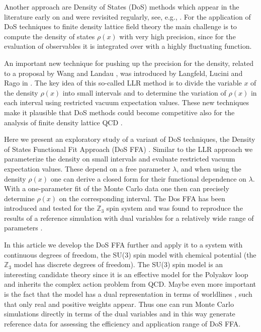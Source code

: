 \documentclass[a4paper,11pt]{article}
\begin{document}
Another approach are Density of States (DoS) methods which appear in the literature early on  
\cite{Gocksch:1987nt,Gocksch:1988iz} and were revisited regularly, see, e.g., 
\cite{Schmidt:2005ap,Fodor:2007vv,Ejiri:2007ga,Ejiri:2012ng}. For the application of DoS techniques 
to finite density lattice field theory the main challenge is to compute the density of states $\rho(x)$ with very high 
precision, since for the evaluation of observables it is integrated over with a highly fluctuating function. 

An important new technique for pushing up the precision for the density, related to a proposal by 
Wang and Landau \cite{PhysRevLett.86.2050}, was introduced by Langfeld, Lucini and Rago in 
\cite{Langfeld:2012ah,Langfeld:2013xbf,Langfeld:2014nta,Langfeld:2015fua,Garron:2016noc}. The key idea of this 
so-called LLR method is to divide the variable 
$x$ of the density $\rho(x)$ into small intervals and to determine the variation of $\rho(x)$ in each interval using restricted 
vacuum expectation values. These new techniques make it plausible that DoS methods could become competitive
also for the analysis of finite density lattice QCD \cite{Gattringer:2016kco}. 

Here we present an exploratory study of a variant of DoS techniques, the Density of States Functional Fit Approach
(DoS FFA) \cite{Mercado:2014dva,Gattringer:2015lra,Gattringer:2015eey}. 
Similar to the LLR approach we parameterize the density on small intervals and evaluate restricted vacuum 
expectation values. These depend on a free parameter $\lambda$, and when using the density $\rho(x)$ one
can derive a closed form for their functional dependence on $\lambda$. With a one-parameter fit of the Monte Carlo data
one then can precisely determine $\rho(x)$ on the corresponding interval. The Dos FFA has been introduced and tested 
for the $\mathds{Z}_3$ spin system and was found to reproduce the results of a reference simulation 
with dual variables for a relatively wide range of parameters \cite{Mercado:2014dva,Gattringer:2015lra,Gattringer:2015eey}.

In this article we develop the DoS FFA further and
apply it to a system with continuous degrees of freedom, the SU(3) spin model with chemical potential 
(the $\mathds{Z}_3$ model has discrete degrees of freedom). The SU(3) spin model is an interesting candidate theory 
since it is an effective model for the Polyakov loop and inherits the complex action problem from QCD. 
Maybe even more important 
is the fact that the model has a dual representation in terms of worldlines \cite{Gattringer:2011gq}, such that 
only real and positive weights appear. Thus one can run Monte Carlo simulations directly in terms of the
dual variables \cite{Mercado:2012ue,Delgado:2012uh} and in this way generate reference data for assessing the
efficiency and application range of DoS FFA. 
\end{document}
